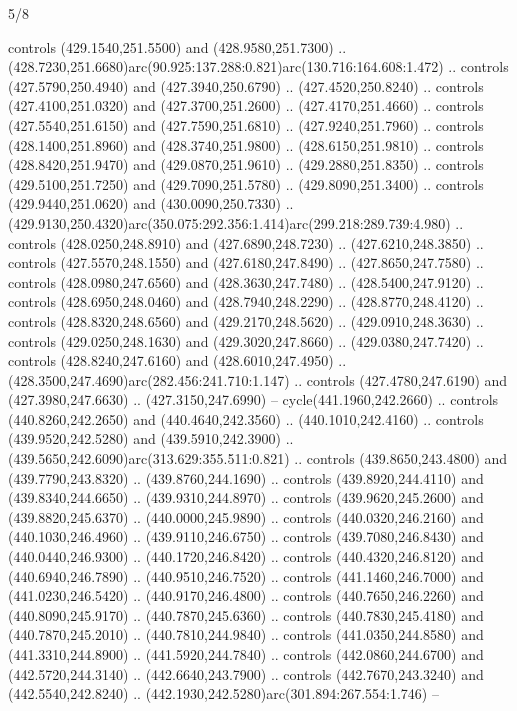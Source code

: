 \begin{flagdescription}{5/8}
\begin{scope}[xshift=0.5\flaglength,yshift=0.5\flagwidth,scale=\flagwidth/475.63]
\begin{scope}[y=0.8pt, x=0.8pt, yscale=-1, xscale=1,shift={(-450,-300)}]
\begin{scope}[cm={{1.0,0.0,0.0,1.0,(-0.0002,0.12556)}},cm={{1.0,0.0,0.0,1.0,(0.00179,0.0)}}]
\begin{scope}[cm={{1.00926,0.0,0.0,1.00926,(-3.1541,-2.47648)}}]
  controls (429.1540,251.5500) and (428.9580,251.7300) ..
  (428.7230,251.6680)arc(90.925:137.288:0.821)arc(130.716:164.608:1.472) ..
  controls (427.5790,250.4940) and (427.3940,250.6790) .. (427.4520,250.8240) ..
  controls (427.4100,251.0320) and (427.3700,251.2600) .. (427.4170,251.4660) ..
  controls (427.5540,251.6150) and (427.7590,251.6810) .. (427.9240,251.7960) ..
  controls (428.1400,251.8960) and (428.3740,251.9800) .. (428.6150,251.9810) ..
  controls (428.8420,251.9470) and (429.0870,251.9610) .. (429.2880,251.8350) ..
  controls (429.5100,251.7250) and (429.7090,251.5780) .. (429.8090,251.3400) ..
  controls (429.9440,251.0620) and (430.0090,250.7330) ..
  (429.9130,250.4320)arc(350.075:292.356:1.414)arc(299.218:289.739:4.980) ..
  controls (428.0250,248.8910) and (427.6890,248.7230) .. (427.6210,248.3850) ..
  controls (427.5570,248.1550) and (427.6180,247.8490) .. (427.8650,247.7580) ..
  controls (428.0980,247.6560) and (428.3630,247.7480) .. (428.5400,247.9120) ..
  controls (428.6950,248.0460) and (428.7940,248.2290) .. (428.8770,248.4120) ..
  controls (428.8320,248.6560) and (429.2170,248.5620) .. (429.0910,248.3630) ..
  controls (429.0250,248.1630) and (429.3020,247.8660) .. (429.0380,247.7420) ..
  controls (428.8240,247.6160) and (428.6010,247.4950) ..
  (428.3500,247.4690)arc(282.456:241.710:1.147) .. controls (427.4780,247.6190)
  and (427.3980,247.6630) .. (427.3150,247.6990) -- cycle(441.1960,242.2660) ..
  controls (440.8260,242.2650) and (440.4640,242.3560) .. (440.1010,242.4160) ..
  controls (439.9520,242.5280) and (439.5910,242.3900) ..
  (439.5650,242.6090)arc(313.629:355.511:0.821) .. controls (439.8650,243.4800)
  and (439.7790,243.8320) .. (439.8760,244.1690) .. controls (439.8920,244.4110)
  and (439.8340,244.6650) .. (439.9310,244.8970) .. controls (439.9620,245.2600)
  and (439.8820,245.6370) .. (440.0000,245.9890) .. controls (440.0320,246.2160)
  and (440.1030,246.4960) .. (439.9110,246.6750) .. controls (439.7080,246.8430)
  and (440.0440,246.9300) .. (440.1720,246.8420) .. controls (440.4320,246.8120)
  and (440.6940,246.7890) .. (440.9510,246.7520) .. controls (441.1460,246.7000)
  and (441.0230,246.5420) .. (440.9170,246.4800) .. controls (440.7650,246.2260)
  and (440.8090,245.9170) .. (440.7870,245.6360) .. controls (440.7830,245.4180)
  and (440.7870,245.2010) .. (440.7810,244.9840) .. controls (441.0350,244.8580)
  and (441.3310,244.8900) .. (441.5920,244.7840) .. controls (442.0860,244.6700)
  and (442.5720,244.3140) .. (442.6640,243.7900) .. controls (442.7670,243.3240)
  and (442.5540,242.8240) .. (442.1930,242.5280)arc(301.894:267.554:1.746) --

\end{scope}
\end{scope}
\end{scope}
\end{scope}
\end{flagdescription}
